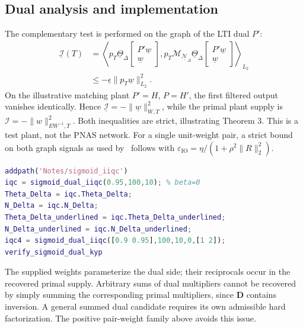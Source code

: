 \subsection{Dual analysis and implementation}
The complementary test is performed on the graph of the LTI dual $P'$:
\begin{align*}
 \underline{\mathcal I}(T)&=
 \left\langle p_T\underline\Theta_\Delta\begin{bmatrix}P'\underline w\\\underline w\end{bmatrix},
 p_T\mathcal M_{\underline{\mathcal N}_\Delta}\underline\Theta_\Delta\begin{bmatrix}P'\underline w\\\underline w\end{bmatrix}
 \right\rangle_{L_2}\\
 &\le-\underline\epsilon\|p_T\underline w\|_{L_2}^2.
\end{align*}
On the illustrative matching plant $P'=H$, $P=H'$, the first filtered output vanishes identically. Hence $\underline{\mathcal I}=-\|\underline w\|_{W,T}^2$, while the primal plant supply is $\mathcal I=-\|w\|_{EW^{-1},T}^2$. Both inequalities are strict, illustrating Theorem 3. This is a test plant, not the PNAS network. For a single unit-weight pair, a strict bound on both graph signals as used by~\cite{suKhong} follows with $\varepsilon_{\mathrm{IO}}=\eta/(1+\rho^2\|R\|_2^2)$.
\begin{lstlisting}[language=Matlab]
addpath('Notes/sigmoid_iiqc')
iqc = sigmoid_dual_iiqc(0.95,100,10); % beta=0
Theta_Delta = iqc.Theta_Delta;
N_Delta = iqc.N_Delta;
Theta_Delta_underlined = iqc.Theta_Delta_underlined;
N_Delta_underlined = iqc.N_Delta_underlined;
iqc4 = sigmoid_dual_iiqc([0.9 0.95],100,10,0,[1 2]);
verify_sigmoid_dual_kyp
\end{lstlisting}
The supplied weights parameterize the dual side; their reciprocals occur in the recovered primal supply. Arbitrary sums of dual multipliers cannot be recovered by simply summing the corresponding primal multipliers, since $\mathbf D$ contains inversion. A general summed dual candidate requires its own admissible hard factorization. The positive pair-weight family above avoids this issue.

